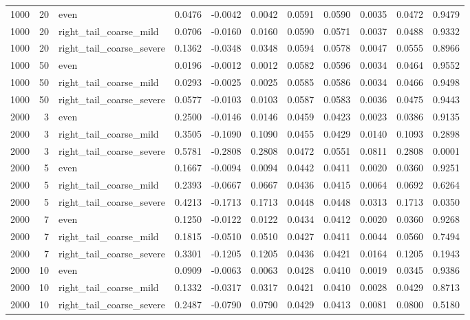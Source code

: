 \begin{table}[!h]
{\begin{tabular}[t]{rrlrrrrrrrr}
1000 & 20 & even & 0.0476 & -0.0042 & 0.0042 & 0.0591 & 0.0590 & 0.0035 & 0.0472 & 0.9479\\
1000 & 20 & right\_tail\_coarse\_mild & 0.0706 & -0.0160 & 0.0160 & 0.0590 & 0.0571 & 0.0037 & 0.0488 & 0.9332\\
1000 & 20 & right\_tail\_coarse\_severe & 0.1362 & -0.0348 & 0.0348 & 0.0594 & 0.0578 & 0.0047 & 0.0555 & 0.8966\\
1000 & 50 & even & 0.0196 & -0.0012 & 0.0012 & 0.0582 & 0.0596 & 0.0034 & 0.0464 & 0.9552\\
1000 & 50 & right\_tail\_coarse\_mild & 0.0293 & -0.0025 & 0.0025 & 0.0585 & 0.0586 & 0.0034 & 0.0466 & 0.9498\\
1000 & 50 & right\_tail\_coarse\_severe & 0.0577 & -0.0103 & 0.0103 & 0.0587 & 0.0583 & 0.0036 & 0.0475 & 0.9443\\
2000 & 3 & even & 0.2500 & -0.0146 & 0.0146 & 0.0459 & 0.0423 & 0.0023 & 0.0386 & 0.9135\\
2000 & 3 & right\_tail\_coarse\_mild & 0.3505 & -0.1090 & 0.1090 & 0.0455 & 0.0429 & 0.0140 & 0.1093 & 0.2898\\
2000 & 3 & right\_tail\_coarse\_severe & 0.5781 & -0.2808 & 0.2808 & 0.0472 & 0.0551 & 0.0811 & 0.2808 & 0.0001\\
2000 & 5 & even & 0.1667 & -0.0094 & 0.0094 & 0.0442 & 0.0411 & 0.0020 & 0.0360 & 0.9251\\
2000 & 5 & right\_tail\_coarse\_mild & 0.2393 & -0.0667 & 0.0667 & 0.0436 & 0.0415 & 0.0064 & 0.0692 & 0.6264\\
2000 & 5 & right\_tail\_coarse\_severe & 0.4213 & -0.1713 & 0.1713 & 0.0448 & 0.0448 & 0.0313 & 0.1713 & 0.0350\\
2000 & 7 & even & 0.1250 & -0.0122 & 0.0122 & 0.0434 & 0.0412 & 0.0020 & 0.0360 & 0.9268\\
2000 & 7 & right\_tail\_coarse\_mild & 0.1815 & -0.0510 & 0.0510 & 0.0427 & 0.0411 & 0.0044 & 0.0560 & 0.7494\\
2000 & 7 & right\_tail\_coarse\_severe & 0.3301 & -0.1205 & 0.1205 & 0.0436 & 0.0421 & 0.0164 & 0.1205 & 0.1943\\
2000 & 10 & even & 0.0909 & -0.0063 & 0.0063 & 0.0428 & 0.0410 & 0.0019 & 0.0345 & 0.9386\\
2000 & 10 & right\_tail\_coarse\_mild & 0.1332 & -0.0317 & 0.0317 & 0.0421 & 0.0410 & 0.0028 & 0.0429 & 0.8713\\
2000 & 10 & right\_tail\_coarse\_severe & 0.2487 & -0.0790 & 0.0790 & 0.0429 & 0.0413 & 0.0081 & 0.0800 & 0.5180\\

\end{tabular}}
\end{table}
